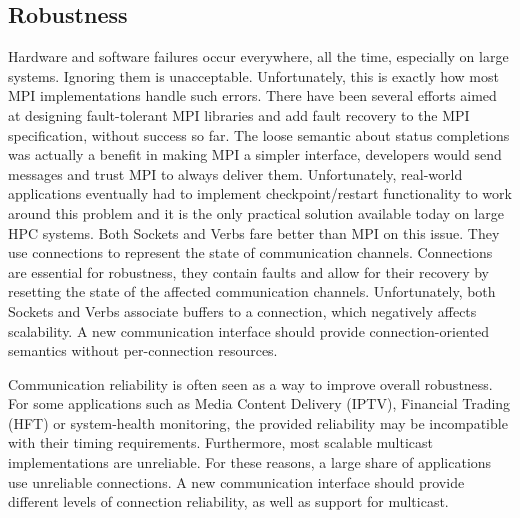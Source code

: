 \subsection{Robustness}
Hardware and software failures occur everywhere, all the time, especially on 
large systems. Ignoring them is unacceptable. Unfortunately, this is exactly 
how most MPI implementations handle such errors. There have been several 
efforts aimed at designing fault-tolerant MPI libraries and add fault recovery 
to the MPI specification, without success so far. The loose semantic about 
status completions was actually a benefit in making MPI a simpler interface, 
developers would send messages and trust MPI to always deliver them. 
Unfortunately, real-world applications eventually had to implement 
checkpoint/restart functionality to work around this problem and it is the 
only practical solution available today on large HPC systems. 
Both Sockets and Verbs fare better than MPI on this issue. They use connections 
to represent the state of communication channels. Connections are essential 
for robustness, they contain faults and allow for their recovery by resetting 
the state of the affected communication channels. 
Unfortunately, both Sockets and Verbs associate buffers to a connection, which 
negatively affects scalability. A new communication interface should provide 
connection-oriented semantics without per-connection resources. 

Communication reliability is often seen as a way to improve overall robustness. 
For some applications such as Media Content Delivery (IPTV), Financial Trading 
(HFT) or system-health monitoring, the provided reliability may be incompatible 
with their timing requirements. 
Furthermore, most scalable multicast implementations are unreliable. For these 
reasons, a large share of applications use unreliable connections. 
A new communication interface should provide different levels of connection 
reliability, as well as support for multicast. 


